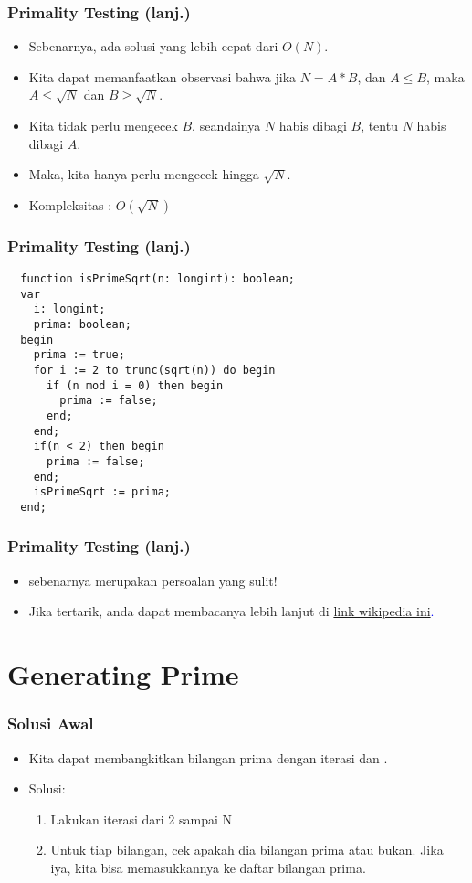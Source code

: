 \begin{frame}
\frametitle{Primality Testing (lanj.)}
\begin{itemize}
  \item Sebenarnya, ada solusi yang lebih cepat dari $O(N)$.
  \item Kita dapat memanfaatkan observasi bahwa jika $N = A*B$, dan $A \leq B$, maka $A \leq \sqrt{N}$ dan $B \geq \sqrt{N}$.
  \item Kita tidak perlu mengecek $B$, seandainya $N$ habis dibagi $B$, tentu $N$ habis dibagi $A$.
  \item Maka, kita hanya perlu mengecek hingga $\sqrt{N}$.
  \item Kompleksitas : $O(\sqrt{N})$
\end{itemize}
\end{frame}

\begin{frame}[fragile]
\frametitle{Primality Testing (lanj.)}
\begin{lstlisting}
  function isPrimeSqrt(n: longint): boolean;
  var
    i: longint;
    prima: boolean;
  begin
    prima := true;
    for i := 2 to trunc(sqrt(n)) do begin
      if (n mod i = 0) then begin
        prima := false;
      end;
    end;
    if(n < 2) then begin
      prima := false;
    end;
    isPrimeSqrt := prima;
  end;  
\end{lstlisting}
\end{frame}

\begin{frame}
\frametitle{Primality Testing (lanj.)}
\begin{itemize}
  \item {} sebenarnya merupakan persoalan yang sulit!
  \item Jika tertarik, anda dapat membacanya lebih lanjut di \textcolor{blue}{\href{https://en.wikipedia.org/wiki/Primality_test}{link wikipedia ini}.} 
\end{itemize}
\end{frame}

\section{Generating Prime}
\frame{\sectionpage}

\begin{frame}
\frametitle{Solusi Awal}
\begin{itemize}
  \item Kita dapat membangkitkan bilangan prima dengan iterasi dan .
  \item Solusi: 
  \begin{enumerate}
    \item Lakukan iterasi dari 2 sampai N
    \item Untuk tiap bilangan, cek apakah dia bilangan prima atau bukan. Jika iya, kita bisa memasukkannya ke daftar bilangan prima.
  \end{enumerate}
\end{itemize}
\end{frame}

